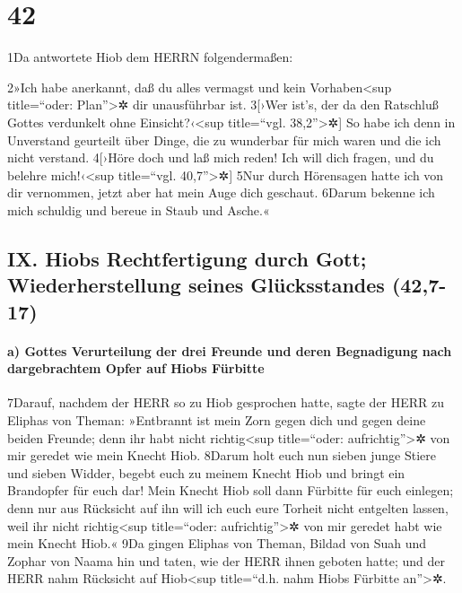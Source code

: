 \hypertarget{section-41}{%
\section{42}\label{section-41}}

1Da antwortete Hiob dem HERRN folgendermaßen:

2»Ich habe anerkannt, daß du alles vermagst und kein
Vorhaben\textless sup title=``oder: Plan''\textgreater✲ dir unausführbar
ist. 3{[}›Wer ist's, der da den Ratschluß Gottes verdunkelt ohne
Einsicht?‹\textless sup title=``vgl. 38,2''\textgreater✲{]} So habe ich
denn in Unverstand geurteilt über Dinge, die zu wunderbar für mich waren
und die ich nicht verstand. 4{[}›Höre doch und laß mich reden! Ich will
dich fragen, und du belehre mich!‹\textless sup title=``vgl.
40,7''\textgreater✲{]} 5Nur durch Hörensagen hatte ich von dir
vernommen, jetzt aber hat mein Auge dich geschaut. 6Darum bekenne ich
mich schuldig und bereue in Staub und Asche.«

\hypertarget{ix.-hiobs-rechtfertigung-durch-gott-wiederherstellung-seines-gluxfccksstandes-427-17}{%
\subsection{IX. Hiobs Rechtfertigung durch Gott; Wiederherstellung
seines Glücksstandes
(42,7-17)}\label{ix.-hiobs-rechtfertigung-durch-gott-wiederherstellung-seines-gluxfccksstandes-427-17}}

\hypertarget{a-gottes-verurteilung-der-drei-freunde-und-deren-begnadigung-nach-dargebrachtem-opfer-auf-hiobs-fuxfcrbitte}{%
\paragraph{a) Gottes Verurteilung der drei Freunde und deren Begnadigung
nach dargebrachtem Opfer auf Hiobs
Fürbitte}\label{a-gottes-verurteilung-der-drei-freunde-und-deren-begnadigung-nach-dargebrachtem-opfer-auf-hiobs-fuxfcrbitte}}

7Darauf, nachdem der HERR so zu Hiob gesprochen hatte, sagte der HERR zu
Eliphas von Theman: »Entbrannt ist mein Zorn gegen dich und gegen deine
beiden Freunde; denn ihr habt nicht richtig\textless sup title=``oder:
aufrichtig''\textgreater✲ von mir geredet wie mein Knecht Hiob. 8Darum
holt euch nun sieben junge Stiere und sieben Widder, begebt euch zu
meinem Knecht Hiob und bringt ein Brandopfer für euch dar! Mein Knecht
Hiob soll dann Fürbitte für euch einlegen; denn nur aus Rücksicht auf
ihn will ich euch eure Torheit nicht entgelten lassen, weil ihr nicht
richtig\textless sup title=``oder: aufrichtig''\textgreater✲ von mir
geredet habt wie mein Knecht Hiob.« 9Da gingen Eliphas von Theman,
Bildad von Suah und Zophar von Naama hin und taten, wie der HERR ihnen
geboten hatte; und der HERR nahm Rücksicht auf Hiob\textless sup
title=``d.h. nahm Hiobs Fürbitte an''\textgreater✲.

